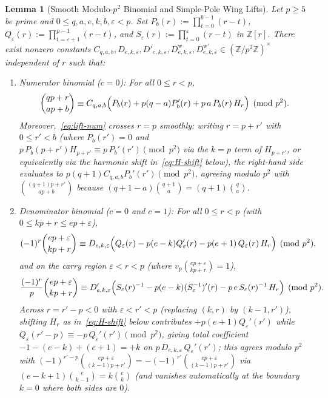 \documentclass[11pt,reqno]{amsart}
\newtheorem{lemma}[theorem]{Lemma}
\theoremstyle{definition}
\theoremstyle{remark}
\newcommand{\ZZ}{\mathbb{Z}}
\begin{document}
\begin{lemma}[Smooth Modulo-$p^2$ Binomial and Simple-Pole Wing Lifts]
\label{lem:binom-lifts-p2}
Let $p \ge 5$ be prime and $0 \le q, a, e, k, b, \varepsilon < p$. Set $P_b(r) := \prod_{t=0}^{b-1}(r - t)$, $Q_\varepsilon(r) := \prod_{t=\varepsilon+1}^{p-1}(r - t)$, and $S_\varepsilon(r) := \prod_{t=0}^{\varepsilon}(r - t)$ in $\ZZ[r]$. There exist nonzero constants $C_{q,a,b}, D_{e,k,\varepsilon}, D'_{e,k,\varepsilon}, D^{\mathrm{w}}_{e,k,\varepsilon}, D^{\mathrm{w}\prime}_{e,k,\varepsilon} \in (\ZZ/p^2\ZZ)^\times$ independent of $r$ such that:
\begin{enumerate}
  \item[\emph{(a)}] \emph{Numerator binomial ($c = 0$):} For all $0 \le r < p$,
  \begin{equation}
  \label{eq:lift-num}
    \binom{qp + r}{ap + b}
    \equiv C_{q,a,b}\Bigl(P_b(r) + p(q - a) P_b'(r) + p\, a\, P_b(r)\, H_r\Bigr) \pmod{p^2}.
  \end{equation}
  Moreover,~\eqref{eq:lift-num} crosses $r = p$ smoothly: writing $r = p + r'$ with $0 \le r' < b$ (where $P_b(r') = 0$ and $p\,P_b(p+r')H_{p+r'} \equiv p\,P_b'(r') \pmod{p^2}$ via the $k = p$ term of $H_{p+r'}$, or equivalently via the harmonic shift in~\eqref{eq:H-shift} below), the right-hand side evaluates to $p(q + 1)C_{q,a,b}P_b'(r') \pmod{p^2}$, agreeing modulo $p^2$ with $\binom{(q+1)p+r'}{ap+b}$ because $(q+1-a)\binom{q+1}{a} = (q+1)\binom{q}{a}$.
  \item[\emph{(b)}] \emph{Denominator binomial ($c = 0$ and $c = 1$):} For all $0 \le r < p$ (with $0 \le kp+r \le ep+\varepsilon$),
  \begin{equation}
  \label{eq:lift-den0}
    (-1)^r \binom{ep + \varepsilon}{kp + r}
    \equiv D_{e,k,\varepsilon}\Bigl(Q_\varepsilon(r) - p(e - k) Q_\varepsilon'(r) - p(e + 1)\, Q_\varepsilon(r)\, H_r\Bigr) \pmod{p^2},
  \end{equation}
  and on the carry region $\varepsilon < r < p$ (where $v_p\binom{ep+\varepsilon}{kp+r} = 1$),
  \begin{equation}
  \label{eq:lift-den1}
    \frac{(-1)^r}{p}\binom{ep + \varepsilon}{kp + r}
    \equiv D'_{e,k,\varepsilon}\Bigl(S_\varepsilon(r)^{-1} - p(e - k) (S_\varepsilon^{-1})'(r) - p\, e\, S_\varepsilon(r)^{-1}\, H_r\Bigr) \pmod{p^2}.
  \end{equation}
  Across $r = r' - p < 0$ with $\varepsilon < r' < p$ (replacing $(k, r)$ by $(k-1, r')$), shifting $H_r$ as in~\eqref{eq:H-shift} below contributes $+p(e+1)Q_\varepsilon'(r')$ while $Q_\varepsilon(r'-p) \equiv -p\,Q_\varepsilon'(r') \pmod{p^2}$, giving total coefficient $-1 - (e - k) + (e + 1) = +k$ on $p\,D_{e,k,\varepsilon}\,Q_\varepsilon'(r')$; this agrees modulo $p^2$ with $(-1)^{r'-p}\binom{ep+\varepsilon}{(k-1)p+r'} = -(-1)^{r'}\binom{ep+\varepsilon}{(k-1)p+r'}$ via $(e - k + 1)\binom{e}{k-1} = k\binom{e}{k}$ (and vanishes automatically at the boundary $k = 0$ where both sides are $0$).

\end{enumerate}
\end{lemma}
\end{document}

